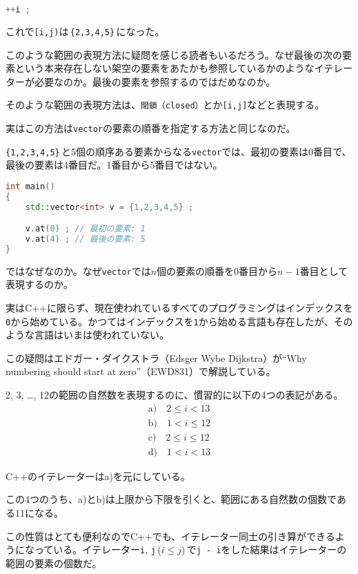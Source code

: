 \begin{lstlisting}[language={C++}]
++i ;
\end{lstlisting}

これで\texttt{[i,j)}は\,\texttt{\{2,3,4,5\}}\,になった。

このような範囲の表現方法に疑問を感じる読者もいるだろう。なぜ最後の次の要素という本来存在しない架空の要素をあたかも参照しているかのようなイテレーターが必要なのか。最後の要素を参照するのではだめなのか。

そのような範囲の表現方法は、\texttt{閉鎖（closed）}とか\texttt{[i,j]}などと表現する。

実はこの方法は\texttt{vector}の要素の順番を指定する方法と同じなのだ。

\texttt{\{1,2,3,4,5\}}\,と5個の順序ある要素からなる\texttt{vector}では、最初の要素は0番目で、最後の要素は4番目だ。1番目から5番目ではない。

\begin{lstlisting}[language={C++}]
int main()
{
    std::vector<int> v = {1,2,3,4,5} ;

    v.at(0) ; // 最初の要素: 1
    v.at(4) ; // 最後の要素: 5
}
\end{lstlisting}

ではなぜなのか。なぜ\texttt{vector}では\(n\)個の要素の順番を0番目から\(n-1\)番目として表現するのか。

実はC++に限らず、現在使われているすべてのプログラミングはインデックスを\texttt{0}から始めている。かつてはインデックスを\texttt{1}から始める言語も存在したが、そのような言語はいまは使われていない。

この疑問はエドガー・ダイクストラ（Edsger Wybe Dijkstra）が``Why numbering should start at zero''（EWD831）で解説している。

2, 3, \ldots, 12の範囲の自然数を表現するのに、慣習的に以下の4つの表記がある。
\begin{gather*}
\textrm{a)}\quad 2 \le i < 13\\
\textrm{b)}\quad 1 < i \le 12\\
\textrm{c)}\quad 2 \le i \le 12\\
\textrm{d)}\quad 1 < i < 13
\end{gather*}

C++のイテレーターはa)を元にしている。

この4つのうち、a)とb)は上限から下限を引くと、範囲にある自然数の個数である11になる。

この性質はとても便利なのでC++でも、イテレーター同士の引き算ができるようになっている。イテレーター\texttt{i}, \texttt{j}\,(\(i \le j\))\,で\texttt{j - i}をした結果はイテレーターの範囲の要素の個数だ。

